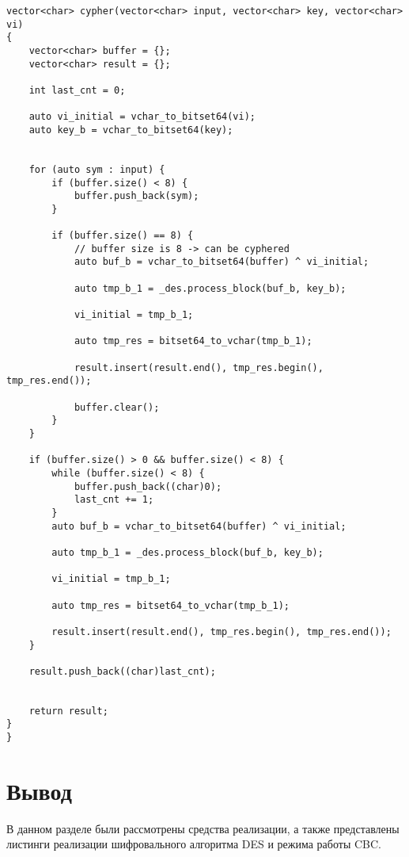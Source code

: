 \begin{lstlisting}[label=lst:ecb,caption=Реализация метода шифрования и дешифрования DES в режиме CBС]
vector<char> cypher(vector<char> input, vector<char> key, vector<char> vi)
{
	vector<char> buffer = {};
	vector<char> result = {};
	
	int last_cnt = 0;
	
	auto vi_initial = vchar_to_bitset64(vi);
	auto key_b = vchar_to_bitset64(key);
	
	
	for (auto sym : input) {
		if (buffer.size() < 8) {
			buffer.push_back(sym);
		}
		
		if (buffer.size() == 8) {
			// buffer size is 8 -> can be cyphered
			auto buf_b = vchar_to_bitset64(buffer) ^ vi_initial;
			
			auto tmp_b_1 = _des.process_block(buf_b, key_b);
			
			vi_initial = tmp_b_1;
			
			auto tmp_res = bitset64_to_vchar(tmp_b_1);
			
			result.insert(result.end(), tmp_res.begin(), tmp_res.end());
			
			buffer.clear();
		}
	}
	
	if (buffer.size() > 0 && buffer.size() < 8) {
		while (buffer.size() < 8) {
			buffer.push_back((char)0);
			last_cnt += 1;
		}
		auto buf_b = vchar_to_bitset64(buffer) ^ vi_initial;
		
		auto tmp_b_1 = _des.process_block(buf_b, key_b);
		
		vi_initial = tmp_b_1;
		
		auto tmp_res = bitset64_to_vchar(tmp_b_1);
		
		result.insert(result.end(), tmp_res.begin(), tmp_res.end());
	}
	
	result.push_back((char)last_cnt);
	
	
	return result;
}
}
\end{lstlisting}

\section*{Вывод}

В данном разделе были рассмотрены средства реализации, а также представлены листинги реализации шифровального алгоритма DES и режима работы CBC.